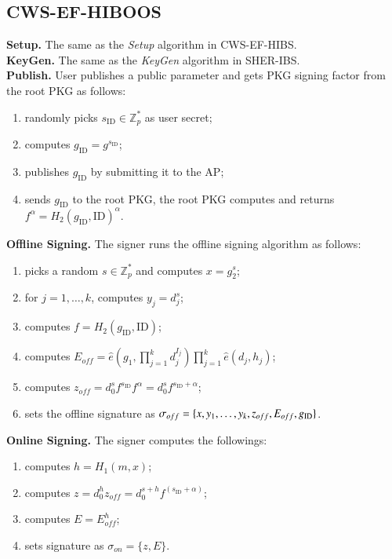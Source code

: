 \documentclass[letter]{ieice}
\begin{document}
\subsection{CWS-EF-HIBOOS} \label{sec-efhiboos}
\textbf{Setup.} 
The same as the \emph{Setup} algorithm in CWS-EF-HIBS.
\\
\textbf{KeyGen.} 
The same as the \emph{KeyGen} algorithm in SHER-IBS.
\\
\textbf{Publish.} User publishes a public parameter and gets PKG signing factor from the root PKG as follows:
\begin{enumerate}
\item randomly picks $s_{\mathrm{ID}} \in \mathbb{Z}_p^*$ as user secret;
\item computes $g_{\mathrm{ID}} = g^{s_{\mathrm{ID}}}$;
\item publishes $g_{\mathrm{ID}}$ by submitting it to the AP;
\item sends $g_{\mathrm{ID}}$ to the root PKG, the root PKG computes and returns $f^\alpha = H_2(g_\mathrm{ID}, \mathrm{ID})^\alpha$. 
\end{enumerate}
\textbf{Offline Signing.} 
The signer runs the offline signing algorithm as follows:
\begin{enumerate}
\item picks a random $s \in \mathbb{Z}_p^*$ and computes $x = g_2^s$;
\item for $j = 1, \ldots, k$, computes $y_j = d_j^{s}$;
\item computes $f = H_2(g_\mathrm{ID}, \mathrm{ID})$;
\item computes $E_{off} = \hat{e}(g_1, \prod_{j=1}^{k} d_j^{I_j})\prod_{j=1}^{k} \hat{e}(d_j, h_j)$;
\item computes $z_{off} = d_0^sf^{s_\mathrm{ID}} f^\alpha = d_0^sf^{s_\mathrm{ID} + \alpha}$;
\item sets the offline signature as $\sigma_{off} = \{x, y_1, \ldots, y_k, z_{off},\\ E_{off}, g_{\mathrm{ID}}\}$.
\end{enumerate}
\textbf{Online Signing.}
The signer computes the followings:
\begin{enumerate}
\item computes  $h = H_1(m, x)$;
\item computes $z = d_0^h z_{off} =  d_0^{s+h}f^{(s_\mathrm{ID} + \alpha)}$;
\item computes $E=E_{off}^h$;
\item sets signature as $\sigma_{on} = \{z, E\}$.
\end{enumerate}
\end{document}
